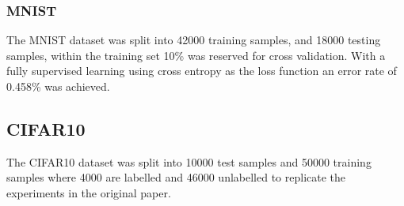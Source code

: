 \documentclass[a4paper]{article}
\begin{document}
\subsubsection{MNIST}
The MNIST dataset was split into 42000 training samples, and 18000 testing samples, within the training set 10\% was reserved for cross validation. With a fully supervised learning using cross entropy as the loss function an error rate of 0.458\% was achieved. 

\subsection{CIFAR10}
The CIFAR10 dataset was split into 10000 test samples and 50000 training samples where 4000 are labelled and 46000 unlabelled to replicate the experiments in the original paper. 
\end{document}
